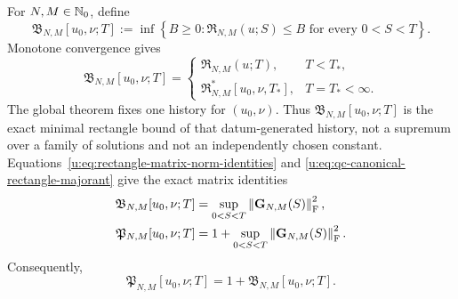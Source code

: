 \begin{definition}
\label{u:def:qc-canonical-majorants}
For \(N,M\in\mathbb N_0\), define
\begin{equation}
 \mathfrak B_{N,M}[u_0,\nu;T]
 :=\inf\left\{B\ge0:
 \mathfrak R_{N,M}(u;S)\le B
 \text{ for every }0<S<T\right\}.
 \label{u:eq:qc-canonical-rectangle-majorant}
\end{equation}
Monotone convergence gives
\begin{equation}
 \mathfrak B_{N,M}[u_0,\nu;T]
 =\begin{cases}
   \mathfrak R_{N,M}(u;T),&T<T_*,\\
   \mathfrak R_{N,M}^*[u_0,\nu,T_*],&T=T_*<\infty.
  \end{cases}
 \label{u:eq:qc-canonical-rectangle-identification}
\end{equation}
The global theorem fixes one history for \((u_0,\nu)\).  Thus
\(\mathfrak B_{N,M}[u_0,\nu;T]\) is the exact minimal rectangle bound of
that datum-generated history, not a supremum over a family of solutions and
not an independently chosen constant.
Equations~\eqref{u:eq:rectangle-matrix-norm-identities} and
\eqref{u:eq:qc-canonical-rectangle-majorant} give the exact matrix identities
\begin{align}
 \mathfrak B_{N,M}[u_0,\nu;T]
 &=\sup_{0<S<T}\left\lVert \mathbf G_{N,M}(S)\right\rVert_{\mathrm F}^2,
 \label{u:eq:qc-B-matrix-identity}\\
 \mathfrak P_{N,M}[u_0,\nu;T]
 &=1+\sup_{0<S<T}\left\lVert \mathbf G_{N,M}(S)\right\rVert_{\mathrm F}^2.
 \label{u:eq:qc-P-matrix-identity}
\end{align}
Consequently,
\begin{equation}
 \mathfrak P_{N,M}[u_0,\nu;T]
 =1+\mathfrak B_{N,M}[u_0,\nu;T].
 \label{u:eq:qc-producer-through-B}
\end{equation}


\end{definition}
